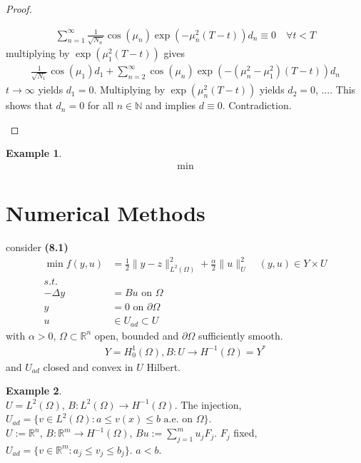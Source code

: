 \documentclass[a4paper,11pt,fleqn]{book}
\theoremstyle{definition}
\newtheorem*{example}{Example}
\theoremstyle{remark}
\begin{document}
\begin{proof}
\begin{enumerate}
		\begin{align*}
			\sum_{n = 1}^\infty \frac{1}{\sqrt{N_n}} \cos(\mu_n) \exp(-\mu_n^2(T - t))d_n \equiv 0 \quad \forall t < T
		\end{align*}
		multiplying by $\exp(\mu_1^2(T - t))$ gives
		\begin{align*}
			\frac{1}{\sqrt{N_1}} \cos(\mu_1) d_1 + \sum_{n = 2}^\infty \cos(\mu_n) \exp( - (\mu_n^2 - \mu_1^2) (T - t))d_n
		\end{align*}
		$t \rightarrow \infty$ yields $d_1 = 0$. Multiplying by $\exp(\mu_n^2 (T - t))$ yields $d_2 = 0$, $\dots$. This shows that $d_n =0$ for all $ n \in \mathbb{N}$ and implies $d \equiv 0$. Contradiction. 
	\end{enumerate}
\end{proof}

\begin{example}
\begin{align*}
	\min
\end{align*}	
\end{example}

\section{Numerical Methods}
consider \textbf{(8.1)}
\begin{align*}
	\min f(y, u) &= \frac{1}{2}\|y - z\|^2_{L^2(\Omega)} + \frac{\alpha}{2}\|u\|_U^2 \quad (y, u) \in Y \times U\\
	s.t.\\
	-\Delta y &= B u \text{ on } \Omega\\
	y &= 0 \text{ on } \partial \Omega\\
	u &\in U_{ad} \subset U
\end{align*}
with $\alpha > 0$, $\Omega \subset \mathbb{R}^n$ open, bounded and $\partial \Omega$ sufficiently smooth. 
\begin{align*}
	Y = H_0^1(\Omega), B : U \rightarrow H^{-1}(\Omega) = Y^*
\end{align*}
and $U_{ad}$ closed and convex in $U$ Hilbert.

\begin{example}\quad\\
$U = L^2(\Omega)$, $B: L^2(\Omega) \rightarrow H^{-1}(\Omega)$. The injection, $U_{ad} = \{ v \in L^2(\Omega): a \le v(x) \le b \text{ a.e. on } \Omega\}$. \\
$U := \mathbb{R}^n$, $B: \mathbb{R}^m \rightarrow H^{-1}(\Omega)$, $Bu := \sum_{j =1}^m u_j F_j$. $F_j$ fixed, $U_{ad} = \{v \in \mathbb{R}^m: a_j \le v_j \le b_j \}$. $a < b$. 	
\end{example}
\end{document}
